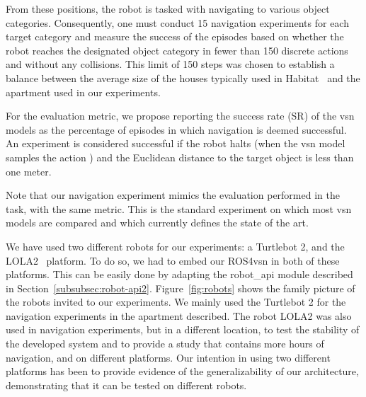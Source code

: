 From these positions, the robot is tasked with navigating to various object categories.
Consequently, one must conduct 15 navigation experiments for each target category and measure the success of the episodes based on whether the robot reaches the designated object category in fewer than 150 discrete actions and without any collisions.
This limit of 150 steps was chosen to establish a balance between the average size of the houses typically used in Habitat~\cite{NEURIPS2021_021bbc7e} and the apartment used in our experiments.

For the evaluation metric, we propose reporting the success rate (SR) of the \acrshort{vsn} models as the percentage of episodes in which navigation is deemed successful.
An experiment is considered successful if the robot halts (when the \acrshort{vsn} model samples the action \stopac) and the Euclidean distance to the target object is less than one meter.

Note that our navigation experiment mimics the evaluation performed in the \objnav~\cite{batra2020} task, with the same metric.
This is the standard experiment on which most \acrshort{vsn} models are compared and which currently defines the state of the art.


We have used two different robots for our experiments: a Turtlebot 2, and the LOLA2~\cite{LOLA} platform.
To do so, we had to embed our ROS4\acrshort{vsn} in both of these platforms.
This can be easily done by adapting the robot\_api module described in Section~\ref{subsubsec:robot-api2}.
Figure~\ref{fig:robots} shows the family picture of the robots invited to our experiments.
We mainly used the Turtlebot 2 for the navigation experiments in the apartment described.
The robot LOLA2 was also used in navigation experiments, but in a different location, to test the stability of the developed system and to provide a study that contains more hours of navigation, and on different platforms.
Our intention in using two different platforms has been to provide evidence of the generalizability of our architecture, demonstrating that it can be tested on different robots.

